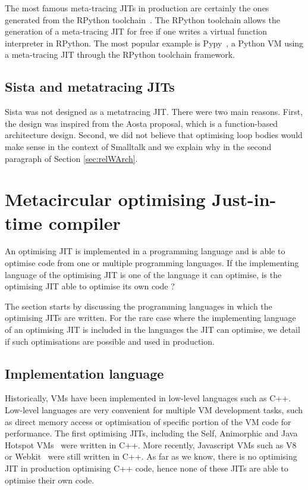 \documentclass[a4paper,12pt,twoside]{../includes/ThesisStyle}
\begin{document}
The most famous meta-tracing JITs in production are certainly the ones generated from the RPython toolchain~\cite{Rigo06a}. The RPython toolchain allows the generation of a meta-tracing JIT for free if one writes a virtual function interpreter in RPython. The most popular example is Pypy~\cite{Rigo06a,PyPyTracing}, a Python VM using a meta-tracing JIT through the RPython toolchain framework.

\subsection{Sista and metatracing JITs}

Sista was not designed as a metatracing JIT. There were two main reasons. First, the design was inspired from the Aosta proposal, which is a function-based architecture design. Second, we did not believe that optimising loop bodies would make sense in the context of Smalltalk and we explain why in the second paragraph of Section \ref{sec:relWArch}.


\section{Metacircular optimising Just-in-time compiler}
\label{sec:implLang}

An optimising JIT is implemented in a programming language and is able to optimise code from one or multiple programming languages. If the implementing language of the optimising JIT is one of the language it can optimise, is the optimising JIT able to optimise its own code ?

The section starts by discussing the programming languages in which the optimising JITs are written. For the rare case where the implementing language of an optimising JIT is included in the languages the JIT can optimise, we detail if such optimisations are possible and used in production.

\subsection{Implementation language}
Historically, VMs have been implemented in low-level languages such as C++. Low-level languages are very convenient for multiple VM development tasks, such as direct memory access or optimisation of specific portion of the VM code for performance. The first optimising JITs, including the Self, Animorphic and Java Hotspot VMs~\cite{UrsPHD,Sun06} were written in C++. More recently, Javascript VMs such as V8 or Webkit~\cite{Webkit15} were still written in C++. As far as we know, there is no optimising JIT in production optimising C++ code, hence none of these JITs are able to optimise their own code.
\end{document}
